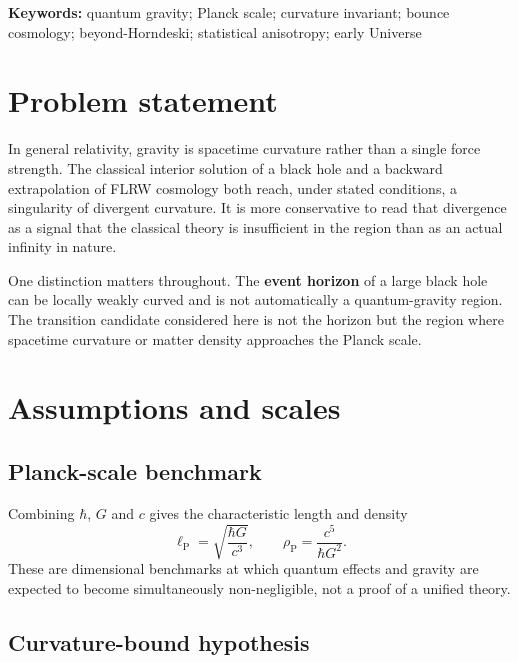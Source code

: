 \documentclass[a4paper,11pt]{article}
\begin{document}
\begin{abstract}
\end{abstract}

\noindent\textbf{Keywords:} quantum gravity; Planck scale; curvature invariant; bounce cosmology; beyond-Horndeski; statistical anisotropy; early Universe

\section{Problem statement}

In general relativity, gravity is spacetime curvature rather than a single force strength. The classical interior solution of a black hole and a backward extrapolation of FLRW cosmology both reach, under stated conditions, a singularity of divergent curvature. It is more conservative to read that divergence as a signal that the classical theory is insufficient in the region than as an actual infinity in nature.

One distinction matters throughout. The \textbf{event horizon} of a large black hole can be locally weakly curved and is not automatically a quantum-gravity region. The transition candidate considered here is not the horizon but the region where spacetime curvature or matter density approaches the Planck scale.

\section{Assumptions and scales}

\subsection{Planck-scale benchmark}

Combining $\hbar$, $G$ and $c$ gives the characteristic length and density
\begin{equation}
\ell_\mathrm{P}=\sqrt{\frac{\hbar G}{c^{3}}},
\qquad
\rho_\mathrm{P}=\frac{c^{5}}{\hbar G^{2}} .
\end{equation}
These are dimensional benchmarks at which quantum effects and gravity are expected to become simultaneously non-negligible, not a proof of a unified theory.

\subsection{Curvature-bound hypothesis}
\end{document}
